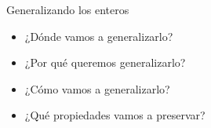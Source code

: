 \begin{frame}{Generalizando los enteros}
  \begin{itemize}
    \item<1-> ¿Dónde vamos a generalizarlo?
    
    \bigskip
    
    \item<3-> ¿Por qué queremos generalizarlo?

    \bigskip

    \item<5-> ¿Cómo vamos a generalizarlo?
    
    \bigskip

    \item<7-> ¿Qué propiedades vamos a preservar?
    
  \end{itemize}
\end{frame}
